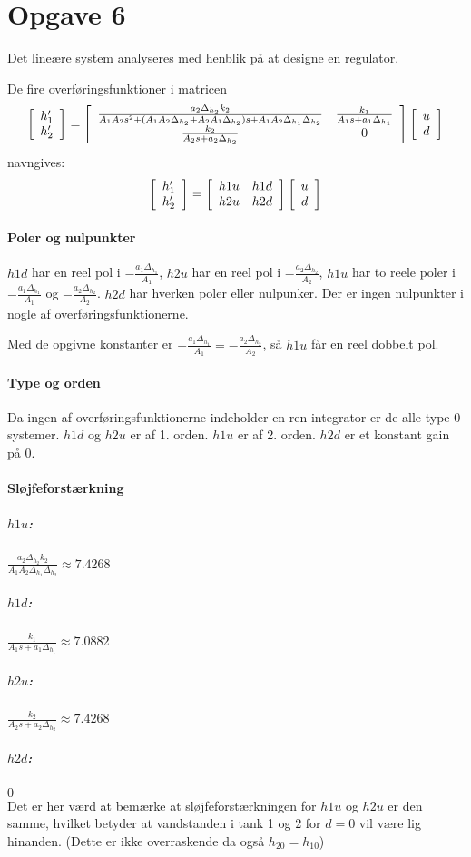 \section{Opgave 6}
Det lineære system analyseres med henblik på at designe en regulator.

De fire overføringsfunktioner i matricen
\begin{equation*}
\matrix{c}{}{}{ h'_1 \\ h'_2 } =
\matrix{c c}{}{}{
\frac{ a_2 \Delta_{h_2} k_2 }
	{ A_1A_2s^2
	+ ( A_1 A_2 \Delta_{h_2} + A_2 A_1 \Delta_{h_2} ) s
	+ A_1 A_2 \Delta_{h_1} \Delta_{h_2} } &
\frac{k_1}{ A_1 s + a_1 \Delta_{h_1} } \\
\frac{k_2}{ A_2 s + a_2 \Delta_{h_2} } &
0
}
\matrix{c}{}{}{ u \\ d }
\end{equation*}
navngives:
\begin{equation*}
\matrix{c}{}{}{ h'_1 \\ h'_2 } =
\matrix{c c}{}{}{
h1u & h1d \\ h2u & h2d
}
\matrix{c}{}{}{ u \\ d }
\end{equation*}

\paragraph{Poler og nulpunkter}
	$h1d$ har en reel pol i $-\frac{a_1\Delta_{h_1}}{A_1}$, $h2u$ har en reel pol i
	$-\frac{a_2\Delta_{h_2}}{A_2}$, $h1u$ har to reele poler i
	$-\frac{a_1\Delta_{h_1}}{A_1}$ og $-\frac{a_2\Delta_{h_2}}{A_2}$. $h2d$ har
	hverken poler eller nulpunker. Der er ingen nulpunkter i nogle af
	overføringsfunktionerne.
	
	Med de opgivne konstanter er $-\frac{a_1\Delta_{h_1}}{A_1} =
	-\frac{a_2\Delta_{h_2}}{A_2}$, så $h1u$ får en reel dobbelt pol.
\paragraph{Type og orden}
	Da ingen af overføringsfunktionerne indeholder en ren integrator er de alle
	type 0 systemer. $h1d$ og $h2u$ er af 1. orden. $h1u$ er af 2. orden. $h2d$ er
	et konstant gain på 0.
\paragraph{Sløjfeforstærkning}
	\subparagraph{$h1u$:}
		$\frac{a_2\Delta_{h_2}k_2}{A_1A_2\Delta_{h_1}\Delta_{h_2}} \approx 7.4268$
	\subparagraph{$h1d$:}
		$\frac{k_1}{A_1s + a_1\Delta_{h_1}} \approx 7.0882$
	\subparagraph{$h2u$:}
		$\frac{k_2}{A_2s + a_2\Delta_{h_2}} \approx 7.4268$
	\subparagraph{$h2d$:}
		$0$\\
	Det er her værd at bemærke at sløjfeforstærkningen for $h1u$ og $h2u$ er den
	samme, hvilket betyder at vandstanden i tank 1 og 2 for $d=0$ vil være lig
	hinanden. (Dette er ikke overraskende da også $h_{20} = h_{10}$)
